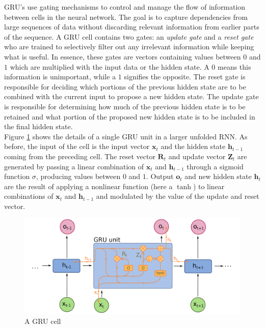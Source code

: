 GRU's use gating mechanisms to control and manage the flow of information between cells in the neural network. The goal is to capture dependencies from large sequences of data without discarding relevant information from earlier parts of the sequence. A GRU cell contains two gates: an \emph{update gate} and a \emph{reset gate} who are trained to selectively filter out any irrelevant information while keeping what is useful. In essence, these gates are vectors containing values between $0$ and $1$ which are multiplied with the input data or the hidden state. A $0$ means this information is unimportant, while a $1$ signifies the opposite. The reset gate is responsible for deciding which portions of the previous hidden state are to be combined with the current input to propose a new hidden state. The update gate  is responsible for determining how much of the previous hidden state is to be retained and what portion of the proposed new hidden state is to be included in the final hidden state.\\
Figure \ref{fig:gru_cell} shows the details of a single GRU unit in a larger unfolded RNN. As before, the input of the cell is the input vector $\bm{x}_t$ and the hidden state $\bm{h}_{t-1}$ coming from the preceding cell. The reset vector $\bm{R}_t$ and update vector $\bm{Z}_t$ are generated by passing a linear combination of $\bm{x}_t$ and $\bm{h}_{t-1}$ through a sigmoid function $\sigma$, producing values between $0$ and $1$. Output $\bm{o}_t$ and new hidden state $\bm{h}_t$ are the result of applying a nonlinear function (here a $\tanh$) to linear combinations of $\bm{x}_t$ and $\bm{h}_{t-1}$ and modulated by the value of the update and reset vector.\\

\begin{figure}[htp]
    \centering
    \includegraphics[width=14cm]{images/gru.png}
    \caption{A GRU cell}
    \label{fig:gru_cell}
\end{figure}

